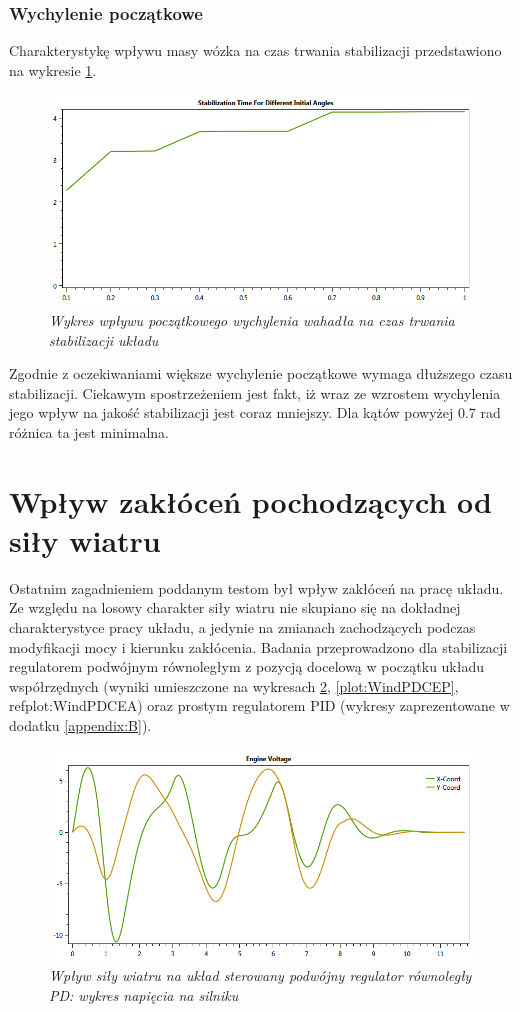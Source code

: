 \documentclass[12pt, oneside]{report}
\theoremstyle{definition}
\begin{document}
\subsubsection{Wychylenie początkowe}
Charakterystykę wpływu masy wózka na czas trwania stabilizacji przedstawiono na wykresie \ref{plot:PendulumAngleQuality}.
\begin{figure}[H]
	\centering
		\includegraphics[width = 320pt]{PendulumAngleQuality} 
		\caption{\textit{Wykres wpływu początkowego wychylenia wahadła na czas trwania stabilizacji układu}}
		\label{plot:PendulumAngleQuality}
\end{figure}

Zgodnie z oczekiwaniami większe wychylenie początkowe wymaga dłuższego czasu stabilizacji. Ciekawym spostrzeżeniem jest fakt, iż wraz ze wzrostem wychylenia jego wpływ na jakość stabilizacji jest coraz mniejszy. Dla kątów powyżej 0.7 rad różnica ta jest minimalna.

\section{Wpływ zakłóceń pochodzących od siły wiatru}
Ostatnim zagadnieniem poddanym testom był wpływ zakłóceń na pracę układu. Ze względu na losowy charakter siły wiatru nie skupiano się na dokładnej charakterystyce pracy układu, a jedynie na zmianach zachodzących podczas modyfikacji mocy i kierunku zakłócenia. Badania przeprowadzono dla stabilizacji regulatorem podwójnym równoległym z pozycją docelową w początku układu współrzędnych (wyniki umieszczone na wykresach \ref{plot:WindPDEV}, \ref{plot:WindPDCEP}, ref{plot:WindPDCEA}) oraz prostym regulatorem PID (wykresy zaprezentowane w dodatku \ref{appendix:B}).

\begin{figure}[H]
	\centering
		\includegraphics[width = 320pt]{WindPDEV} 
		\caption{\textit{Wpływ siły wiatru na układ sterowany podwójny regulator równoległy PD: wykres napięcia na silniku}}
		\label{plot:WindPDEV}
\end{figure}
\end{document}
